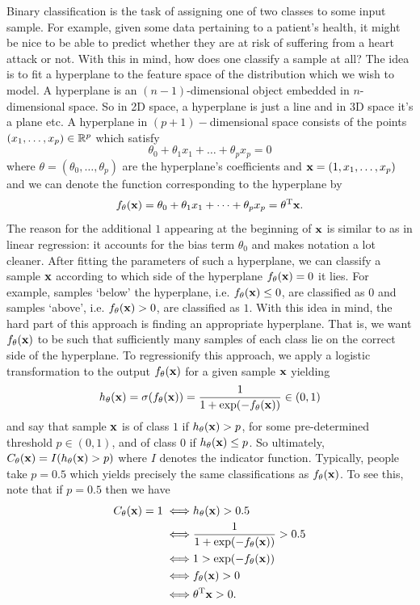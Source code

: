 \documentclass[11pt]{article}
\begin{document}
Binary classification is the task of assigning one of two classes to some input sample. For example, given some data pertaining to a patient's health, it might be nice to be able to predict whether they are at risk of suffering from a heart attack or not. With this in mind, how does one classify a sample at all? The idea is to fit a hyperplane to the feature space of the distribution which we wish to model. A hyperplane is an $(n-1)$-dimensional object embedded in $n$-dimensional space. So in 2D space, a hyperplane is just a line and in 3D space it's a plane etc. A hyperplane in $(p+1)-$dimensional space consists of the points $(x_1,\dots,x_p)\in\mathbb{R}^p$ which satisfy
$$
\theta_0+\theta_1x_1+\dots+\theta_px_p=0
$$
where $\theta=(\theta_0,\dots,\theta_p)$ are the hyperplane's coefficients and $\mathbf{x}=(1,x_1,\dots,x_p)$ and we can denote the function corresponding to the hyperplane by
$$
f_{\theta}(\mathbf{x})
=
\theta_0+\theta_1x_1+\dots+\theta_px_p
=
\theta^{\text{T}}\mathbf{x}.
$$
The reason for the additional $1$ appearing at the beginning of $\mathbf{x}$ is similar to as in linear regression: it accounts for the bias term $\theta_0$ and makes notation a lot cleaner. After fitting the parameters of such a hyperplane, we can classify a sample $\mathbf{x}$ according to which side of the hyperplane $f_{\theta}(\mathbf{x})=0$ it lies. For example, samples `below' the hyperplane, i.e. $f_{\theta}(\mathbf{x})\leq0$, are classified as $0$ and samples `above', i.e. $f_{\theta}(\mathbf{x})>0$, are classified as $1$. With this idea in mind, the hard part of this approach is finding an appropriate hyperplane. That is, we want $f_{\theta}(\mathbf{x})$ to be such that sufficiently many samples of each class lie on the correct side of the hyperplane. To regressionify this approach, we apply a logistic transformation to the output $f_{\theta}(\mathbf{x})$ for a given sample $\mathbf{x}$ yielding
$$
h_{\theta}(\mathbf{x})
=
\sigma(f_{\theta}(\mathbf{x}))
=
\frac{1}{1+\exp(-f_{\theta}(\mathbf{x}))}\in(0,1)
$$
and say that sample $\mathbf{x}$ is of class $1$ if $h_{\theta}(\mathbf{x})>p$, for some pre-determined threshold $p\in(0,1)$, and of class $0$ if $h_{\theta}(\mathbf{x})\leq p$. So ultimately, $C_{\theta}(\mathbf{x})=I(h_{\theta}(\mathbf{x})>p)$ where $I$ denotes the indicator function. Typically, people take $p=0.5$ which yields precisely the same classifications as $f_{\theta}(\mathbf{x})$. To see this, note that if $p=0.5$ then we have
\begin{align*}
    C_{\theta}(\mathbf{x})=1
    \iff & h_{\theta}(\mathbf{x})>0.5\\
    \iff & \frac{1}{1+\exp(-f_{\theta}(\mathbf{x}))}>0.5\\
    \iff & 1 > \exp(-f_{\theta}(\mathbf{x}))\\
    \iff & f_{\theta}(\mathbf{x}) > 0\\
    \iff & \theta^{\text{T}}\mathbf{x} > 0.
\end{align*}
\end{document}
